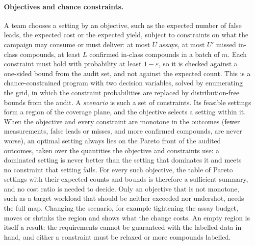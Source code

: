 \documentclass[twocolumn,10pt]{article}
\begin{document}
\paragraph{Objectives and chance constraints.} A team chooses a setting by an objective, such as the expected number of false leads, the expected cost or the expected yield, subject to constraints on what the campaign may consume or must deliver: at most $U$ assays, at most $U'$ missed in-class compounds, at least $L$ confirmed in-class compounds in a batch of $m$. Each constraint must hold with probability at least $1-\varepsilon$, so it is checked against a one-sided bound from the audit set, and not against the expected count. This is a chance-constrained program\citep{CharnesCooper1959} with two decision variables, solved by enumerating the grid, in which the constraint probabilities are replaced by distribution-free bounds from the audit. A \emph{scenario} is such a set of constraints. Its feasible settings form a region of the coverage plane, and the objective selects a setting within it. When the objective and every constraint are monotone in the outcomes (fewer measurements, false leads or misses, and more confirmed compounds, are never worse), an optimal setting always lies on the Pareto front of the audited outcomes, taken over the quantities the objective and constraints use: a dominated setting is never better than the setting that dominates it and meets no constraint that setting fails. For every such objective, the table of Pareto settings with their expected counts and bounds is therefore a sufficient summary, and no cost ratio is needed to decide. Only an objective that is not monotone, such as a target workload that should be neither exceeded nor undershot, needs the full map. Changing the scenario, for example tightening the assay budget, moves or shrinks the region and shows what the change costs. An empty region is itself a result: the requirements cannot be guaranteed with the labelled data in hand, and either a constraint must be relaxed or more compounds labelled.
\end{document}
